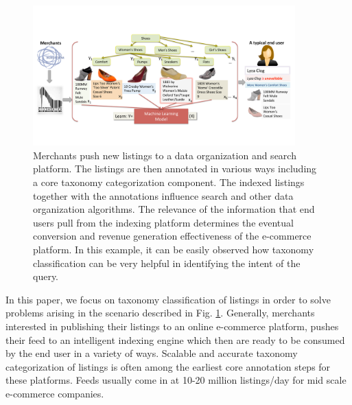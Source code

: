 \begin{figure}[ht]
	\centering
	\includegraphics[width=0.9\textwidth]{images/push-pull}
	\vspace{-0.2cm}
	\caption{{\small Merchants push new listings to a data organization and search platform. The listings are then annotated in various ways including a core taxonomy categorization component. The indexed listings together with the annotations influence search and other data organization algorithms. The relevance of the information that end users pull from the indexing platform determines the eventual conversion and revenue generation effectiveness of the e-commerce platform. In this example, it can be easily observed how taxonomy classification can be very helpful in identifying the intent of the query.}}
	\label{Fig:push-pull}
\end{figure}
\vspace{-0.5cm}

In this paper, we focus on taxonomy classification of listings in order to solve problems arising in the scenario described in Fig. \ref{Fig:push-pull}.
Generally, merchants interested in publishing their listings to an online e-commerce platform, pushes their feed to an intelligent indexing engine which then are ready to be consumed by the end user in a variety of ways.
Scalable and accurate taxonomy categorization of listings is often among the earliest core annotation steps for these platforms.
Feeds usually come in at 10-20 million listings/day for mid scale e-commerce companies.

